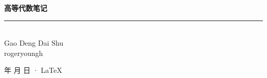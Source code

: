 \documentclass[cn,11pt,blue,normal,founder]{elegantbook}
\begin{document}
\newcommand\mfrac[2]{\dfrac{#1\smash[b]{\strut}}{#2\smash[t]{\strut}}}
\newcommand\RR{\mathbb{R}}
\newcommand\NN{\mathbb{N}}
\newcommand\QQ{\mathbb{Q}}
\newcommand\CC{\mathbb{C}}
\newcommand\ee{\mathrm{e}}
\newcommand\dd{\mathrm{d}}
\newcommand\uppi{\mathrm{\pi}}
\newcommand\aaa{\boldsymbol{\alpha}}
\newcommand\bbb{\boldsymbol{\beta}}
\renewcommand\ggg{\boldsymbol{\gamma}}
\newcommand\ling{\boldsymbol{0}}

\begin{titlepage}
	\vspace*{25ex}%
	\begin{minipage}{.9\textwidth}
	\flushright
		{\textbf{高等代数笔记}}\\%
		\rule{\linewidth}{1pt}\\ \vspace{2ex}
		{\textsf{Gao Deng Dai Shu}} \\%
		\vspace{20ex}%
		{rogeryoungh}%
	\end{minipage}
	\vfill\centering
	{\number\year 年 \number\month 月 \number\day 日 · \LaTeX{}}
\end{titlepage}
\clearpage{\hypersetup{hidelinks}\tableofcontents}

\clearpage

\end{document}
